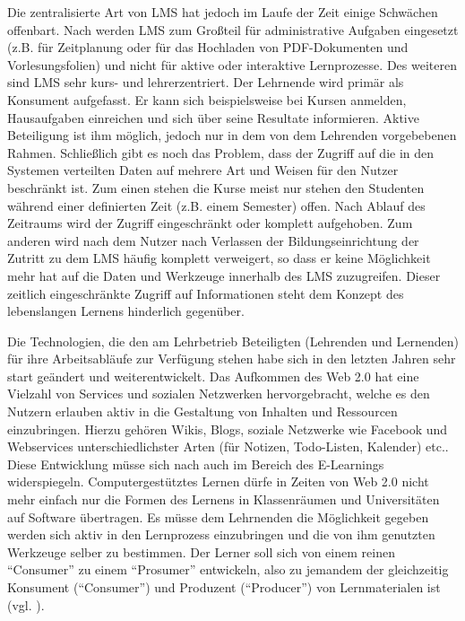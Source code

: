 Die zentralisierte Art von LMS hat jedoch im Laufe der Zeit einige Schwächen offenbart. Nach \cite{Mott2010} werden LMS zum Großteil für administrative Aufgaben eingesetzt (z.B. für Zeitplanung oder für das Hochladen von PDF-Dokumenten und Vorlesungsfolien) und nicht für aktive oder interaktive Lernprozesse. Des weiteren sind LMS sehr kurs- und lehrerzentriert. Der Lehrnende wird primär als Konsument aufgefasst. Er kann sich beispielsweise bei Kursen anmelden, Hausaufgaben einreichen und sich über seine Resultate informieren. Aktive Beteiligung ist ihm möglich, jedoch nur in dem von dem Lehrenden vorgebebenen Rahmen.
Schließlich gibt es noch das Problem, dass der Zugriff auf die in den Systemen verteilten Daten auf mehrere Art und Weisen für den Nutzer beschränkt ist. Zum einen stehen die Kurse meist nur stehen den Studenten während einer definierten Zeit (z.B. einem Semester) offen. Nach Ablauf des Zeitraums wird der Zugriff eingeschränkt oder komplett aufgehoben. Zum anderen wird nach \cite{Schaffert2008a} dem Nutzer nach Verlassen der Bildungseinrichtung der Zutritt zu dem LMS häufig komplett verweigert, so dass er keine Möglichkeit mehr hat auf die Daten und Werkzeuge innerhalb des LMS zuzugreifen. Dieser zeitlich eingeschränkte Zugriff auf Informationen steht dem Konzept des lebenslangen Lernens hinderlich gegenüber.

Die Technologien, die den am Lehrbetrieb Beteiligten (Lehrenden und Lernenden) für ihre Arbeitsabläufe zur Verfügung stehen habe sich in den letzten Jahren sehr start geändert und weiterentwickelt. Das Aufkommen des Web 2.0 hat eine Vielzahl von Services und sozialen Netzwerken hervorgebracht, welche es den Nutzern erlauben aktiv in die Gestaltung von Inhalten und Ressourcen einzubringen. Hierzu gehören Wikis, Blogs, soziale Netzwerke wie Facebook und Webservices unterschiedlichster Arten (für Notizen, Todo-Listen, Kalender) etc..
Diese Entwicklung müsse sich nach \cite{Attwell2007} auch im Bereich des E-Learnings widerspiegeln. Computergestütztes Lernen dürfe in Zeiten von Web 2.0 nicht mehr einfach nur die Formen des Lernens in Klassenräumen und Universitäten auf Software übertragen. Es müsse dem Lehrnenden die Möglichkeit gegeben werden sich aktiv in den Lernprozess einzubringen und die von ihm genutzten Werkzeuge selber zu bestimmen. Der Lerner soll sich von einem reinen "`Consumer"' zu einem "`Prosumer"' entwickeln, also zu jemandem der gleichzeitig Konsument ("`Consumer"') und Produzent ("`Producer"') von Lernmaterialen ist (vgl. \cite{Schaffert2008a}).

